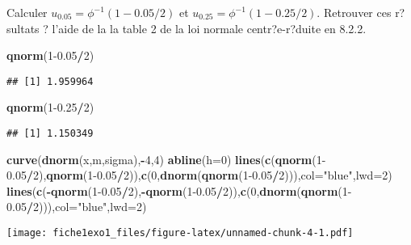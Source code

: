 \documentclass[]{article}
\newenvironment{Shaded}{\begin{snugshade}}{\end{snugshade}}
\newcommand{\DataTypeTok}[1]{\textcolor[rgb]{0.13,0.29,0.53}{#1}}
\newcommand{\DecValTok}[1]{\textcolor[rgb]{0.00,0.00,0.81}{#1}}
\newcommand{\FloatTok}[1]{\textcolor[rgb]{0.00,0.00,0.81}{#1}}
\newcommand{\KeywordTok}[1]{\textcolor[rgb]{0.13,0.29,0.53}{\textbf{#1}}}
\newcommand{\NormalTok}[1]{#1}
\newcommand{\OperatorTok}[1]{\textcolor[rgb]{0.81,0.36,0.00}{\textbf{#1}}}
\newcommand{\StringTok}[1]{\textcolor[rgb]{0.31,0.60,0.02}{#1}}
\begin{document}
Calculer \(u_{0.05} = \phi^{-1}(1-0.05/2)\) et
\(u_{0.25} = \phi^{-1}(1-0.25/2)\). Retrouver ces r?sultats ? l'aide de
la la table 2 de la loi normale centr?e-r?duite en 8.2.2.

\begin{Shaded}
\begin{Highlighting}[]
\KeywordTok{qnorm}\NormalTok{(}\DecValTok{1}\FloatTok{-0.05}\OperatorTok{/}\DecValTok{2}\NormalTok{)}
\end{Highlighting}
\end{Shaded}

\begin{verbatim}
## [1] 1.959964
\end{verbatim}

\begin{Shaded}
\begin{Highlighting}[]
\KeywordTok{qnorm}\NormalTok{(}\DecValTok{1}\FloatTok{-0.25}\OperatorTok{/}\DecValTok{2}\NormalTok{)}
\end{Highlighting}
\end{Shaded}

\begin{verbatim}
## [1] 1.150349
\end{verbatim}

\begin{Shaded}
\begin{Highlighting}[]
\KeywordTok{curve}\NormalTok{(}\KeywordTok{dnorm}\NormalTok{(x,m,sigma),}\OperatorTok{-}\DecValTok{4}\NormalTok{,}\DecValTok{4}\NormalTok{)}
\KeywordTok{abline}\NormalTok{(}\DataTypeTok{h=}\DecValTok{0}\NormalTok{)}
\KeywordTok{lines}\NormalTok{(}\KeywordTok{c}\NormalTok{(}\KeywordTok{qnorm}\NormalTok{(}\DecValTok{1}\FloatTok{-0.05}\OperatorTok{/}\DecValTok{2}\NormalTok{),}\KeywordTok{qnorm}\NormalTok{(}\DecValTok{1}\FloatTok{-0.05}\OperatorTok{/}\DecValTok{2}\NormalTok{)),}\KeywordTok{c}\NormalTok{(}\DecValTok{0}\NormalTok{,}\KeywordTok{dnorm}\NormalTok{(}\KeywordTok{qnorm}\NormalTok{(}\DecValTok{1}\FloatTok{-0.05}\OperatorTok{/}\DecValTok{2}\NormalTok{))),}\DataTypeTok{col=}\StringTok{"blue"}\NormalTok{,}\DataTypeTok{lwd=}\DecValTok{2}\NormalTok{)}
\KeywordTok{lines}\NormalTok{(}\KeywordTok{c}\NormalTok{(}\OperatorTok{-}\KeywordTok{qnorm}\NormalTok{(}\DecValTok{1}\FloatTok{-0.05}\OperatorTok{/}\DecValTok{2}\NormalTok{),}\OperatorTok{-}\KeywordTok{qnorm}\NormalTok{(}\DecValTok{1}\FloatTok{-0.05}\OperatorTok{/}\DecValTok{2}\NormalTok{)),}\KeywordTok{c}\NormalTok{(}\DecValTok{0}\NormalTok{,}\KeywordTok{dnorm}\NormalTok{(}\KeywordTok{qnorm}\NormalTok{(}\DecValTok{1}\FloatTok{-0.05}\OperatorTok{/}\DecValTok{2}\NormalTok{))),}\DataTypeTok{col=}\StringTok{"blue"}\NormalTok{,}\DataTypeTok{lwd=}\DecValTok{2}\NormalTok{)}
\end{Highlighting}
\end{Shaded}

\texttt{[image: fiche1exo1\_files/figure-latex/unnamed-chunk-4-1.pdf]}
\end{document}

